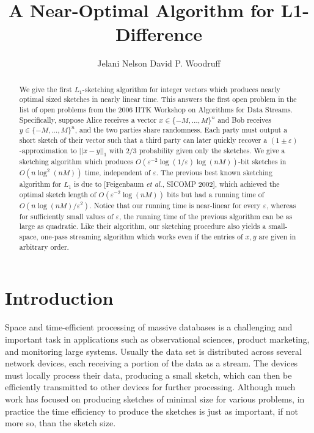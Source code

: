 \documentclass[letterpaper,11pt]{article}
\newcommand{\eps}{\varepsilon}
\newcommand{\oct}{\quad\quad}                                   \renewcommand{\And}{\text{\normalfont\,~and~\,}}
\newcommand{\SectionName}[1]{\label{sec:#1}}
\begin{document}
\author{Jelani Nelson\footnotemark[2]\oct
  David P. Woodruff\footnotemark[3]}

\date{}


\title{A Near-Optimal Algorithm for L1-Difference}

\maketitle

\begin{abstract}
\thispagestyle{empty}
\noindent

We give the first $L_1$-sketching algorithm for integer vectors which
produces nearly optimal sized sketches in nearly linear time. This
answers the first open problem in the list of open problems 
from the 2006 IITK Workshop on Algorithms for Data Streams. 
Specifically, suppose Alice
receives a vector $x\in\{-M,\ldots,M\}^n$ and Bob receives
$y\in\{-M,\ldots,M\}^n$,
and the two parties share randomness.  Each party must output a short 
sketch of their vector such that a
third party can later quickly recover a $(1\pm\eps)$-approximation to
$||x-y||_1$ with $2/3$ probability given only the sketches.
We give a sketching algorithm which produces
$O(\eps^{-2}\log(1/\eps)\log(nM))$-bit sketches in $O(n\log^2(nM))$
time, independent of $\eps$. The
previous best known sketching algorithm for $L_1$ is due to
[Feigenbaum {\it et al.}, SICOMP 2002], which achieved the optimal
sketch length of
$O(\eps^{-2}\log(nM))$ bits but had a running time of
$O(n\log(nM)/\eps^2)$. Notice that our
running time is near-linear for every $\eps$, whereas for sufficiently
small values of $\eps$, the running time of the previous algorithm can
be as large as
quadratic. Like their algorithm, our sketching
procedure also yields a small-space, one-pass streaming algorithm
which works even if the
entries of $x,y$ are given in arbitrary order. 
\end{abstract}

\section{Introduction}\SectionName{intro}
Space and time-efficient processing of massive databases is a
challenging and important task in applications such as observational
sciences, product marketing, and monitoring large systems. Usually the
data set is distributed across several network devices, each receiving
a portion of the data as a stream. The devices must locally
process their data, producing a small sketch, which can then be
efficiently transmitted to other devices for further
processing. Although much work has focused on producing sketches of
minimal size for various problems, in practice the time efficiency to
produce the sketches is just as important, if not more so, than the
sketch size. 
\end{document}
